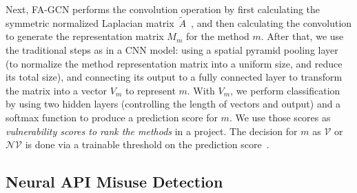 Next, FA-GCN performs the convolution operation by first calculating
the symmetric normalized Laplacian matrix~$\tilde{A}$~\cite{GCN16},
and then calculating the convolution to generate the representation
matrix $M_{m}$ for the method $m$. After that, we use the traditional
steps as in a CNN model: using a spatial pyramid pooling layer (to
normalize the method representation matrix into a uniform size, and
reduce its total size), and connecting its output to a fully connected
layer to transform the matrix into a vector $V_m$ to represent
$m$. With $V_m$, we perform classification by using two hidden layers
(controlling the length of vectors and output) and a softmax function
to produce a prediction score for $m$. We use those scores as {\em
  vulnerability scores to rank the methods} in a project. The decision
for $m$ as $\mathcal{V}$ or $\mathcal{NV}$ is done via a trainable
threshold on the prediction score~\cite{li2018vuldeepecker,li2019improving}.


\subsection{Neural API Misuse Detection}


